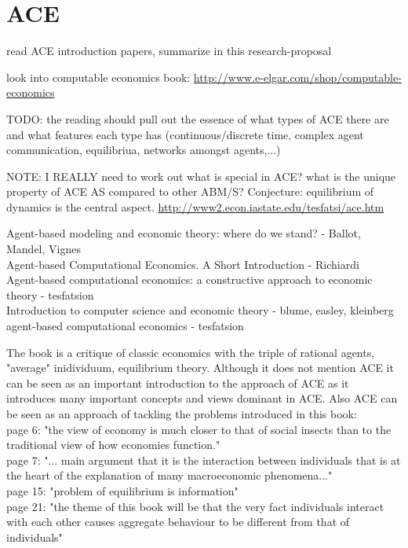 
\chapter{ACE} 
read ACE introduction papers, summarize in this research-proposal

look into computable economics book: \url{http://www.e-elgar.com/shop/computable-economics}

TODO: the reading should pull out the essence of what types of ACE there are and what features each type has (continuous/discrete time, complex agent communication, equilibriua, networks amongst agents,...)

NOTE: I REALLY need to work out what is special in ACE? what is the unique property of ACE AS compared to other ABM/S? Conjecture: equilibrium of dynamics is the central aspect.
\url{http://www2.econ.iastate.edu/tesfatsi/ace.htm}

\cite{mandel_2015} Agent-based modeling and economic theory: where do we stand? - Ballot, Mandel, Vignes \\
\cite{richiardi_2007} Agent-based Computational Economics. A Short Introduction - Richiardi \\
\cite{tesfatsion_2006} Agent-based computational economics: a constructive approach to economic theory - tesfatsion \\
\cite{kleinberg_easley_2015} Introduction to computer science and economic theory - blume, easley, kleinberg \\
\cite{tesfatsion_2002} agent-based computational economics - tesfatsion 



The book \cite{KirmanComplex2010} is a critique of classic economics with the triple of rational agents, "average" inidividuum, equilibrium theory. Although it does not mention ACE it  can be seen as an important introduction to the approach of ACE as it introduces many important concepts and views dominant in ACE. Also ACE can be seen as an approach of tackling the problems introduced in this book: \\

page 6: "the view of economy is much closer to that of social insects than to the traditional view of how economies function." \\
page 7: "... main argument that it is the interaction between individuals that is at the heart of the explanation of many macroeconomic phenomena..." \\
page 15: "problem of equilibrium is information" \\
page 21: "the theme of this book will be that the very fact individuals interact with each other causes aggregate behaviour to be different from that of individuals" \\


